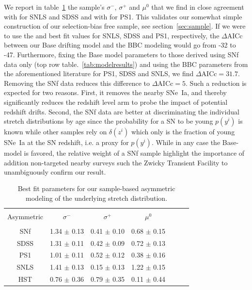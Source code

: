 \documentclass[]{aa} %
\newcommand{\mr}[1]{{\textcolor[rgb]{0.60,0.10,0.6}{#1}}}
\begin{document}
\mr{We report in table~\ref{tab:bbc} the sample's $\sigma^-$,  $\sigma^+$ and
    $\mu^0$ that we find in close agreement with \cite{scolnic2016} for SNLS and
    SDSS and with \cite{scolnic2018a} for PS1. This  validates our somewhat
    simple construction of our selection-bias free sample, see
    section~\ref{sec:sample}.  If we were to use the \cite{scolnic2016} and
    \cite{scolnic2018a} best fit values for SNLS, SDSS and PS1, respectively,
    the $\Delta\mathrm{AICc}$ between our Base drifting model and the BBC
    modeling would go from -32 to -47.  Furthermore, fixing the Base model
    parameters to those derived using SNf data only (top row
    table.~\ref{tab:modelresults}) and using the BBC parameters from the
    aforementioned literature for PS1, SDSS and SNLS, we find
    $\Delta\mathrm{AICc}=31.7$. Removing the SNf data reduces this difference to
    $\Delta\mathrm{AICc}=5$.  Such a reduction is expected for two reasons.
    First, it removes the nearby SNe~Ia, and thereby significantly reduces the
    redshift level arm to probe the impact of potential redshift drifts.
    Second, the SNf data are better at discriminating the individual stretch
    distributions by age since the probability for a SN to be young $p(y^i)$ is
    known while other samples rely on $\delta(z^i)$ which only is the fraction
    of young SNe~Ia at the SN redshift, i.e. a proxy for $p(y^i)$.  While in any
case the Base-model is favored, the relative weight of a SNf sample highlight
the  importance of addition non-targeted nearby surveys such the Zwicky
Transient Facility \cite[ZTF,][]{bellm2019,graham2019} to unambiguously confirm
our result.}


\begin{table}
    \centering
    \caption{Best fit parameters for our sample-based asymmetric modeling of the
    underlying stretch distribution.}
    \label{tab:bbc}
    \begin{tabular}{c c c c c c c}\hline\hline\\[-0.8em]
    Asymmetric & $\sigma^-$ & $\sigma^+$ & $\mu^0$ \\\hline\\[-0.8em]
    SNf &  1.34 $\pm$ 0.13 & 0.41 $\pm$ 0.10 & 0.68 $\pm$ 0.15\\[0.15em]
    SDSS & 1.31 $\pm$ 0.11 & 0.42 $\pm$ 0.09 & 0.72 $\pm$ 0.13 \\[0.15em]
    PS1 &  1.01 $\pm$ 0.11 & 0.52 $\pm$ 0.12 & 0.38 $\pm$ 0.16 \\[0.15em]
    SNLS & 1.41 $\pm$ 0.13 & 0.15 $\pm$ 0.13 & 1.22 $\pm$ 0.15 \\[0.15em]
    HST &  0.76 $\pm$ 0.36 & 0.79 $\pm$ 0.35 & 0.11 $\pm$ 0.44 \\\hline\hline
    \end{tabular}
\end{table}
\end{document}
